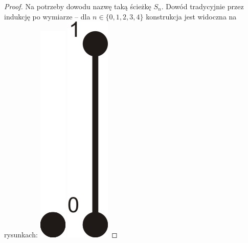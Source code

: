 \documentclass{pracamgr}
\begin{document}
    \begin{proof}
     Na potrzeby dowodu nazwę taką ścieżkę $S_n$.
     Dowód tradycyjnie przez indukcję po wymiarze -- dla $n\in\{0,1,2,3,4\}$ konstrukcja jest widoczna na rysunkach:\newline
     \hspace*{0pt}\includegraphics[scale=0.6]{img/Q0_long_path.jpg}
     \hspace*{12pt}\includegraphics[scale=0.6]{img/Q1_long_path.jpg}

\end{proof}
\end{document}
